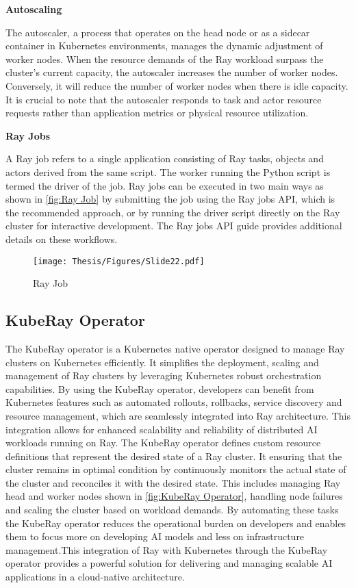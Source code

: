 \textbf{Autoscaling}

The autoscaler, a process that operates on the head node or as a sidecar container in Kubernetes environments, manages the dynamic adjustment of worker nodes. When the resource demands of the Ray workload surpass the cluster’s current capacity, the autoscaler increases the number of worker nodes. Conversely, it will reduce the number of worker nodes when there is idle capacity. It is crucial to note that the autoscaler responds to task and actor resource requests rather than application metrics or physical resource utilization. \cite{ray_doc}

\clearpage

\textbf{Ray Jobs}

A Ray job refers to a single application consisting of Ray tasks, objects and actors derived from the same script. The worker running the Python script is termed the driver of the job. Ray jobs can be executed in two main ways as shown in \autoref{fig:Ray Job} by submitting the job using the Ray jobs API, which is the recommended approach, or by running the driver script directly on the Ray cluster for interactive development. The Ray jobs API guide provides additional details on these workflows. \cite{ray_doc}


\captionsetup{justification=centering}
\begin{figure}[h]
\centering
\texttt{[image: Thesis/Figures/Slide22.pdf]}
\caption{\label{fig:Ray Job}Ray Job \cite{ray_doc}}
\end{figure}



\subsection{KubeRay Operator}

The KubeRay operator is a Kubernetes native operator designed to manage Ray clusters on Kubernetes efficiently. It simplifies the deployment, scaling and management of Ray clusters by leveraging Kubernetes robust orchestration capabilities. By using the KubeRay operator, developers can benefit from Kubernetes features such as automated rollouts, rollbacks, service discovery and resource management, which are seamlessly integrated into Ray architecture. This integration allows for enhanced scalability and reliability of distributed AI workloads running on Ray. The KubeRay operator defines custom resource definitions  that represent the desired state of a Ray cluster. It ensuring that the cluster remains in optimal condition by continuously monitors the actual state of the cluster and reconciles it with the desired state. This includes managing Ray head and worker nodes shown in \autoref{fig:KubeRay Operator}, handling node failures and scaling the cluster based on workload demands. By automating these tasks the KubeRay operator reduces the operational burden on developers and enables them to focus more on developing AI models and less on infrastructure management.This integration of Ray with Kubernetes through the KubeRay operator provides a powerful solution for delivering and managing scalable AI applications in a cloud-native architecture. \cite{anyscale_blog, ray_doc}

